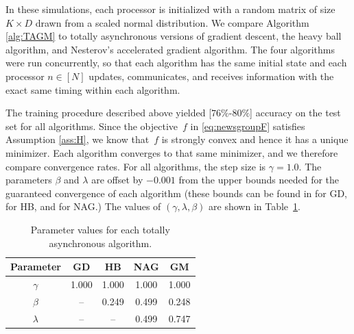 \documentclass[9pt,shortpaper,twoside,web]{ieeecolor}
\newcommand{\blue}[1]{{\textcolor{blue}{#1}}}
\begin{document}
    In these simulations, each processor is initialized with a random matrix of size $K\times D$ drawn from a scaled normal distribution. 
    We compare Algorithm \ref{alg:TAGM} to totally asynchronous versions of gradient
    descent, the heavy ball algorithm, and Nesterov's accelerated gradient algorithm. 
    The four algorithms were run concurrently, 
    so that each algorithm has the same initial state and each processor $n\in[N]$ updates, communicates, and receives information with the exact same timing within each algorithm.

    The training procedure described above yielded [$76\%$-$80\%$] accuracy on the test set for all algorithms.
    Since the objective~$f$ in \eqref{eq:newsgroupF} satisfies Assumption \ref{ass:H}, 
    we know that~$f$ is strongly convex and hence it has a unique minimizer. 
    Each algorithm converges to that same minimizer, and 
    we therefore compare convergence rates. 
    For all algorithms, the step size is $\gamma=1.0$.
    The parameters $\beta$ and $\lambda$ are offset by $-0.001$ from the upper bounds needed for the guaranteed convergence of each algorithm (these bounds can be found in \cite{bertsekas1989parallel} for GD, \cite{hustig2023totally} for HB, and \cite{pond2024} for NAG.) 
    The values of $(\gamma,\lambda,\beta)$ are shown in Table~\ref{tab:param}.

    \begin{table}[ht]
        \centering
        \begin{tabular}{c| cccc}
            \toprule
            \textbf{Parameter} & \textbf{GD} & \textbf{HB} & \textbf{NAG} & \textbf{GM} \\
            \midrule
             $\gamma$ & 1.000 & 1.000 & 1.000 & 1.000 \\
             $\beta$ & -- & 0.249 & 0.499 & 0.248 \\
             $\lambda$ & -- & -- & 0.499 & 0.747 \\
             \bottomrule
        \end{tabular}
        \caption{Parameter values for each totally asynchronous algorithm.}
        \label{tab:param}
    \end{table}
    
\end{document}

